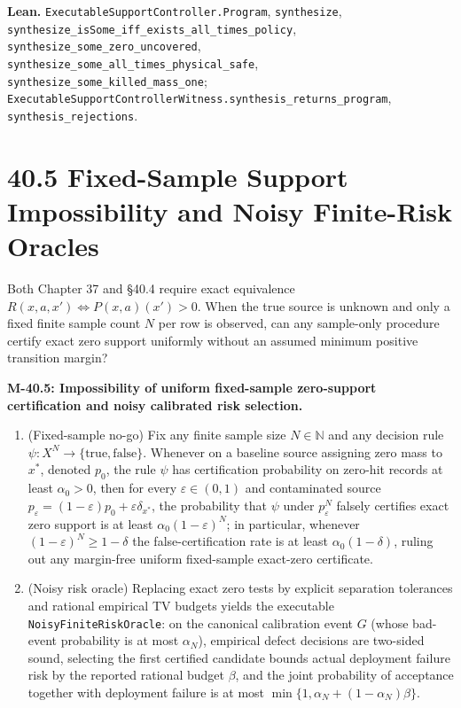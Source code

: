 \documentclass[
  english,
  11pt,
  oneside]{book}
\providecommand{\tightlist}{%
  \setlength{\itemsep}{0pt}\setlength{\parskip}{0pt}}
\begin{document}
\textbf{Lean.} \nolinkurl{ExecutableSupportController.Program}, \texttt{synthesize}, \nolinkurl{synthesize_isSome_iff_exists_all_times_policy}, \nolinkurl{synthesize_some_zero_uncovered}, \nolinkurl{synthesize_some_all_times_physical_safe}, \nolinkurl{synthesize_some_killed_mass_one}; \nolinkurl{ExecutableSupportControllerWitness.synthesis_returns_program}, \nolinkurl{synthesis_rejections}.

\section{40.5 Fixed-Sample Support Impossibility and Noisy Finite-Risk Oracles}\label{fixed-sample-support-impossibility-and-noisy-finite-risk-oracles}

Both Chapter 37 and §40.4 require exact equivalence \(R(x,a,x')\iff P(x,a)(x')>0\). When the true source is unknown and only a fixed finite sample count \(N\) per row is observed, can any sample-only procedure certify exact zero support uniformly without an assumed minimum positive transition margin?

\hypertarget{m-40-5}{}\label{m-40-5}

\textbf{M-40.5: Impossibility of uniform fixed-sample zero-support certification and noisy calibrated risk selection.}

\begin{enumerate}
\def\labelenumi{\arabic{enumi}.}
\tightlist
\item
  (Fixed-sample no-go) Fix any finite sample size \(N\in\mathbb N\) and any decision rule \(\psi:X^N\to\{\mathrm{true},\mathrm{false}\}\). Whenever on a baseline source assigning zero mass to \(x^*\), denoted \(p_0\), the rule \(\psi\) has certification probability on zero-hit records at least \(\alpha_0>0\), then for every \(\varepsilon\in(0,1)\) and contaminated source \(p_\varepsilon=(1-\varepsilon)p_0+\varepsilon\delta_{x^*}\), the probability that \(\psi\) under \(p_\varepsilon^N\) falsely certifies exact zero support is at least \(\alpha_0(1-\varepsilon)^N\); in particular, whenever \((1-\varepsilon)^N\ge 1-\delta\) the false-certification rate is at least \(\alpha_0(1-\delta)\), ruling out any margin-free uniform fixed-sample exact-zero certificate.
\item
  (Noisy risk oracle) Replacing exact zero tests by explicit separation tolerances and rational empirical TV budgets yields the executable \nolinkurl{NoisyFiniteRiskOracle}: on the canonical calibration event \(G\) (whose bad-event probability is at most \(\alpha_N\)), empirical defect decisions are two-sided sound, selecting the first certified candidate bounds actual deployment failure risk by the reported rational budget \(\beta\), and the joint probability of acceptance together with deployment failure is at most \(\min\{1,\alpha_N+(1-\alpha_N)\beta\}\).
\end{enumerate}
\end{document}
